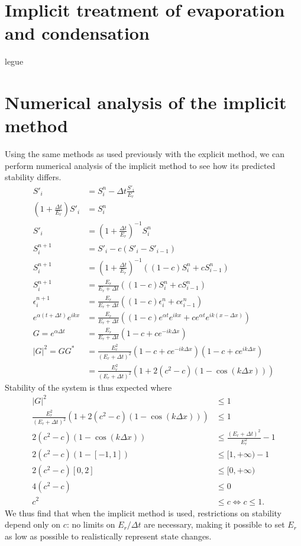 \documentclass[11pt]{article}
\begin{document}
\section{Implicit treatment of evaporation and condensation}
legue

\section{Numerical analysis of the implicit method}
Using the same methods as used previously with the explicit method, we can perform numerical analysis of the implicit method to see how its predicted stability differs.
\begin{align*}
S'_i &= S^n_i - \Delta t\frac{S'_i}{E_r}				\\
\left(1+\frac{\Delta t}{E_r}\right)S'_i &= S^n_i		\\
S'_i &= \left(1+\frac{\Delta t}{E_r}\right)^{-1}S^n_i	\\
S^{n+1}_i &= S'_i - c\left(S'_i - S'_{i-1}\right)			\\
S^{n+1}_i &= \left(1+\frac{\Delta t}{E_r}\right)^{-1}\left(\left(1-c\right)S^n_i + cS^n_{i-1}\right)	\\
S^{n+1}_i &= \frac{E_r}{E_r+\Delta t}\left(\left(1-c\right)S^n_i + cS^n_{i-1}\right)				\\
\epsilon^{n+1}_i &= \frac{E_r}{E_r+\Delta t}\left(\left(1-c\right)\epsilon^n_i + c\epsilon^n_{i-1}\right)	\\
e^{\alpha\left(t+\Delta t\right)}e^{ikx} &= \frac{E_r}{E_r+\Delta t}\left(\left(1-c\right)e^{\alpha t}e^{ikx} + ce^{\alpha t}e^{ik\left(x-\Delta x\right)}\right)		\\
G = e^{\alpha\Delta t} &= \frac{E_r}{E_r+\Delta t}\left(1 - c + ce^{-ik\Delta x}\right)	\\
|G|^2 = G G^* &= \frac{E_r^2}{\left(E_r+\Delta t\right)^2}\left(1 - c + ce^{-ik\Delta x}\right)\left(1 - c + ce^{ik\Delta x}\right)	\\
&= \frac{E_r^2}{\left(E_r+\Delta t\right)^2}\left(1 + 2(c^2-c)\left(1 - \cos\left(k\Delta x\right)\right)\right)
\end{align*}
Stability of the system is thus expected where
\begin{align*}
|G|^2 &\leq 1 \\
\frac{E_r^2}{\left(E_r+\Delta t\right)^2}\left(1 + 2(c^2-c)\left(1 - \cos\left(k\Delta x\right)\right)\right) &\leq 1 \\
2(c^2-c)\left(1 - \cos\left(k\Delta x\right)\right) &\leq \frac{\left(E_r+\Delta t\right)^2}{E_r^2} - 1 \\
2(c^2-c)\left(1 - [-1,1]\right) &\leq [1,+\infty) - 1 \\
2(c^2-c)[0,2] &\leq [0,+\infty) \\
4\left(c^2 - c\right) &\leq 0 \\
c^2 &\leq c \Leftrightarrow c \leq 1.
\end{align*}
We thus find that when the implicit method is used, restrictions on stability depend only on $c$: no limits on $E_r/\Delta t$ are necessary, making it possible to set $E_r$ as low as possible to realistically represent state changes.

\newpage


\end{document}
